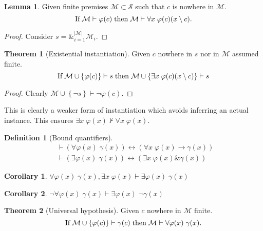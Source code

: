 \documentclass{amsbook}
\newcommand{\setsm}[1]{\left\{#1\right\}}
\newcommand{\infers}{\mathrel\vdash}
\newcommand{\theorem}{\mathord\vdash\medspace}
\newcommand{\univ}[1]{\mathord\forall#1\;}
\newcommand{\exis}[1]{\mathord\exists#1\;}
\newcommand{\then}{\mathrel\rightarrow}
\newcommand{\conj}{\mathrel\&}
\newcommand{\eqv}{\mathrel\leftrightarrow}
\DeclareMathOperator*{\amp}{\&}
\theoremstyle{definition}
\newtheorem{thm}{Theorem}[section]
\newtheorem{lmm}{Lemma}[section]
\newtheorem{crl}{Corollary}[section]
\newtheorem{dfn}{Definition}[section]
\begin{document}
\begin{lmm}
    Given finite premises $\mathcal M \subset \mathcal S$ such that $c$ is nowhere in $\mathcal M$.
    $$\text{If\;} \mathcal M \infers \varphi(c) \text{\;then\;} \mathcal M \infers \univ x \varphi(c)(x \setminus c)\text.$$
    \begin{proof}
        Consider $s = \amp_{i=1}^{|\mathcal M|} \mathcal M_i$.
    \end{proof}
\end{lmm}

\begin{thm}[Existential instantiation]
    Given $c$ nowhere in $s$ nor in $\mathcal M$ assumed finite.
    $$\text{If\;} \mathcal M \cup \setsm{\varphi(c)} \infers s \text{\;then\;} \mathcal M \cup \setsm{\exis x \varphi(c)(x \setminus c)} \infers s$$
    \begin{proof}
        Clearly $\mathcal M \cup \setsm{\neg s} \infers \neg\varphi(c)$.
    \end{proof}
\end{thm}

This is clearly a weaker form of instantiation which avoids inferring an actual instance. This ensures $\exis x \varphi(x) \nvdash \univ x \varphi(x)$.

\begin{dfn}[Bound quantifiers]
    \begin{align}
         & \theorem \left( \univ{\varphi(x)} \gamma(x) \right)  \eqv \left( \univ x \varphi(x) \then \gamma(x) \right) \\
         & \theorem \left( \exis{\varphi(x)} \gamma(x) \right)  \eqv \left( \exis x \varphi(x) \conj \gamma(x) \right)
    \end{align}
\end{dfn}

\begin{crl}
    $\univ{\varphi(x)}\gamma(x), \exis x \varphi(x) \infers \exis{\varphi(x)} \gamma(x)$
\end{crl}

\begin{crl}
    $\neg\univ{\varphi(x)}\gamma(x) \infers \exis{\varphi(x)}\neg\gamma(x)$
\end{crl}

\begin{thm}[Universal hypothesis]
    Given $c$ nowhere in $\mathcal M$ finite.
    $$\text{If\;}\mathcal M \cup \setsm{\varphi(c)} \infers \gamma(c) \text{\;then\;} \mathcal M \infers \univ{\varphi(x)} \gamma(x)\text{.}$$
\end{thm}
\end{document}
